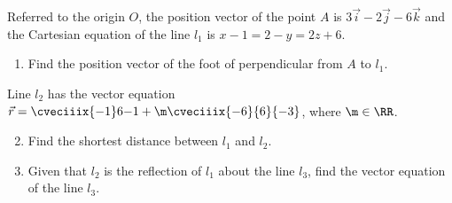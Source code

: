 \begin{problem}
    Referred to the origin $O$, the position vector of the point $A$ is $3 \vec i - 2 \vec j - 6 \vec k$ and the Cartesian equation of the line $l_1$ is $x-1 = 2-y = 2z+6$. 
        
    \begin{enumerate}
        \item Find the position vector of the foot of perpendicular from $A$ to $l_1$.
    \end{enumerate}

    Line $l_2$ has the vector equation $\vec r = \cveciiix{-1}6{-1} + \m \cveciiix{-6}{6}{-3}$, where $\m \in \RR$.

    \begin{enumerate}
        \setcounter{enumi}{1}
        \item Find the shortest distance between $l_1$ and $l_2$.
        \item Given that $l_2$ is the reflection of $l_1$ about the line $l_3$, find the vector equation of the line $l_3$.
    \end{enumerate}
\end{problem}
